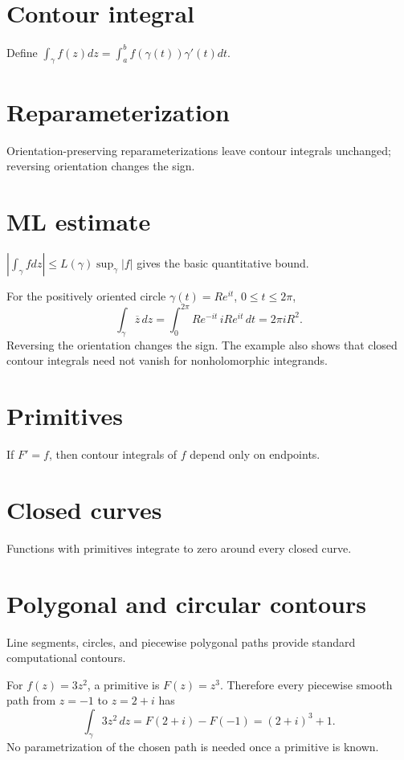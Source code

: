 \section{Contour integral}
Define $\int_\gamma f(z)dz=\int_a^bf(\gamma(t))\gamma'(t)dt$.

\section{Reparameterization}
Orientation-preserving reparameterizations leave contour integrals unchanged; reversing orientation changes the sign.

\section{ML estimate}
$|\int_\gamma fdz|\le L(\gamma)\sup_\gamma|f|$ gives the basic quantitative bound.

\begin{example}\label{ex:iv04-expand-02}
For the positively oriented circle \(\gamma(t)=Re^{it}\), \(0\le t\le2\pi\),
\[
\int_\gamma \overline z\,dz
=\int_0^{2\pi}Re^{-it}\,iRe^{it}\,dt
=2\pi iR^2.
\]
Reversing the orientation changes the sign. The example also shows that closed contour integrals need not vanish for nonholomorphic integrands.
\end{example}
\section{Primitives}
If $F'=f$, then contour integrals of $f$ depend only on endpoints.

\section{Closed curves}
Functions with primitives integrate to zero around every closed curve.

\section{Polygonal and circular contours}
Line segments, circles, and piecewise polygonal paths provide standard computational contours.

\begin{example}\label{ex:iv04-expand-03}
For \(f(z)=3z^2\), a primitive is \(F(z)=z^3\). Therefore every piecewise smooth path from \(z=-1\) to \(z=2+i\) has
\[
\int_\gamma 3z^2\,dz=F(2+i)-F(-1)=(2+i)^3+1.
\]
No parametrization of the chosen path is needed once a primitive is known.
\end{example}
